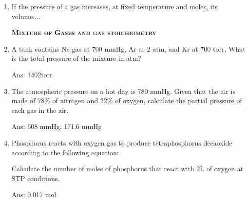 \documentclass[main.tex]{subfiles}
\begin{document}
\begin{multicols*}{2}
\begin{enumerate}
\item If the pressure of a gas increases, at fixed temperature and moles, its volume....
\begin{enumerate}[label=(\alph*)]
\end{enumerate}





{\raggedright\textsc{\textbf{Mixture of Gases and gas stoichiometry }}\par}


\item  A tank contains Ne gas at 700 mmHg, Ar at 2 atm, and Kr at 700 torr. What is the total pressure of the mixture in atm?
\begin{flushright}\small Ans: 1402torr\end{flushright}


\item The atmospheric pressure on a hot day is 780 mmHg. Given that the air is made of 78\% of nitrogen and 22\% of oxygen, calculate the partial pressure of each gas in the air.
\begin{flushright}\small Ans:  608 mmHg,  171.6 mmHg\end{flushright}


\item Phosphorus reacts with oxygen gas to produce tetraphosphorus decaoxide according to the following equation:
\begin{center} \end{center}
Calculate the number of moles of phosphorus that react with 2L of oxygen at STP conditions.
\begin{flushright}\small Ans: 0.017 mol\end{flushright}



\end{enumerate}
\end{multicols*}
\end{document}
